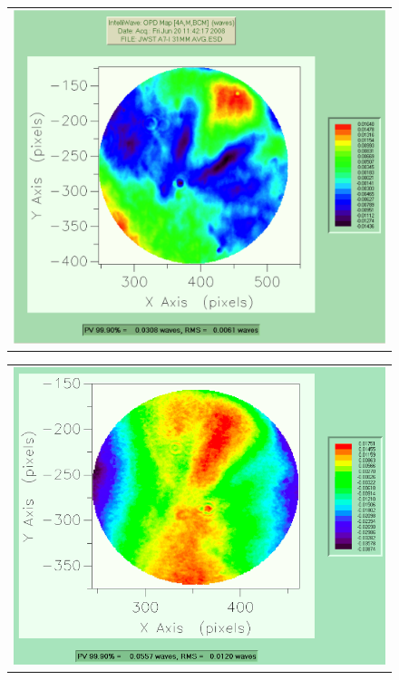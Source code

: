    \begin{figure}
   \begin{minipage}[b]{0.5\linewidth} %
   \begin{center}
   \begin{tabular}{c}
   \includegraphics[width=\textwidth]{chSPIE_2010_JWST/figs/A7I_interf_31mm_grat_uncoat.png}
   \end{tabular}
   \end{center}
   \end{minipage}
   \hspace{0.0001cm} %
\begin{minipage}[b]{0.5\linewidth}
\begin{center}
   \begin{tabular}{c}
   \includegraphics[width=\textwidth]{chSPIE_2010_JWST/figs/A7I_post_coat.png}

\end{tabular}
\end{center}
\end{minipage}
\end{figure}
